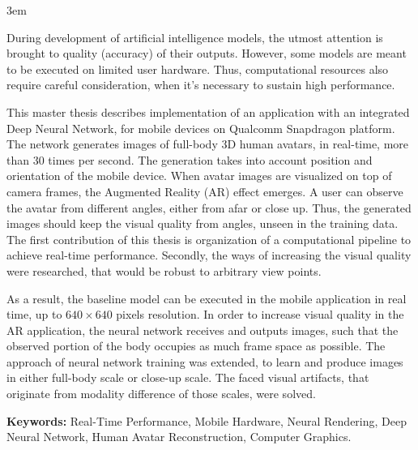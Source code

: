 \emergencystretch 3em

\par
During development of artificial intelligence models, the utmost attention is brought to quality (accuracy) of their outputs. However, some models are meant to be executed on limited user hardware. Thus, computational resources also require careful consideration, when it's necessary to sustain high performance.

\par
This master thesis describes implementation of an application with an integrated Deep Neural Network, for mobile devices on Qualcomm Snapdragon platform. The network generates images of full-body 3D human avatars, in real-time, more than 30 times per second. The generation takes into account position and orientation of the mobile device. When avatar images are visualized on top of camera frames, the Augmented Reality (AR) effect emerges. A user can observe the avatar from different angles, either from afar or close up. Thus, the generated images should keep the visual quality from angles, unseen in the training data. The first contribution of this thesis is organization of a computational pipeline to achieve real-time performance. Secondly, the ways of increasing the visual quality were researched, that would be robust to arbitrary view points.

\par
As a result, the baseline model \cite{model:stylepeople21} can be executed in the mobile application in real time, up to $640\times640$ pixels resolution. In order to increase visual quality in the AR application, the neural network receives and outputs images, such that the observed portion of the body occupies as much frame space as possible. The approach of neural network training was extended, to learn and produce images in either full-body scale or close-up scale. The faced visual artifacts, that originate from modality difference of those scales, were solved. 

\par
\textbf{Keywords:} Real-Time Performance, Mobile Hardware, Neural Rendering, Deep Neural Network, Human Avatar Reconstruction, Computer Graphics.  
